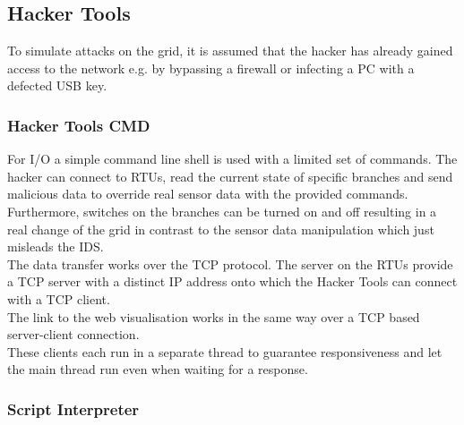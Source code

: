 \documentclass[conference]{IEEEtran}
\begin{document}
	\subsection{Hacker Tools}
		
		To simulate attacks on the grid, it is assumed that the hacker has already gained access to the network e.g. by bypassing a firewall or infecting a PC with a defected USB key.
		
		\subsubsection{Hacker Tools CMD}
			
			For I/O a simple command line shell is used with a limited set of commands. The hacker can connect to RTUs, read the current state of specific branches and send malicious data to override real sensor data with the provided commands. Furthermore, switches on the branches can be turned on and off resulting in a real change of the grid in contrast to the sensor data manipulation which just misleads the IDS. \\
			The data transfer works over the TCP protocol. The server on the RTUs provide a TCP server with a distinct IP address onto which the Hacker Tools can connect with a TCP client. \\
			The link to the web visualisation works in the same way over a TCP based server-client connection. \\
			These clients each run in a separate thread to guarantee responsiveness and let the main thread run even when waiting for a response.
			
		\subsubsection{Script Interpreter}
		
\end{document}
